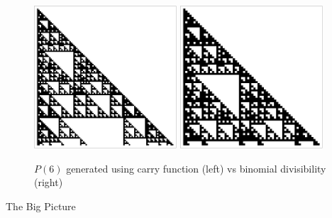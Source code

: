 \documentclass{beamer}
\begin{document}
\begin{frame}
    \begin{figure}
        \includegraphics[width=0.475\textwidth]{Mod6CP.pdf}
        \hfill
        \includegraphics[width=0.475\textwidth]{Mod6.pdf}
        \caption{$P(6)$ generated using carry function (left) vs binomial divisibility (right)}
    \end{figure}
        
\end{frame}

\begin{frame}
    \centering
    \Large
    The Big Picture
\end{frame}
\end{document}
